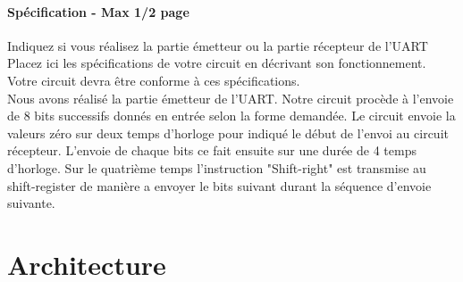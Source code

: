 \documentclass[a4paper]{article} %
\begin{document}


\begin{tcolorbox}[colframe=Monokaimagenta,colback=white]
\paragraph %
{Spécification - Max 1/2 page } 
Indiquez si vous réalisez la partie émetteur ou la partie récepteur de l’UART
Placez ici les spécifications de votre circuit en décrivant son fonctionnement. Votre circuit devra être conforme à ces spécifications.\\

Nous avons réalisé la partie émetteur de l'UART. Notre circuit procède à l'envoie de 8 bits successifs donnés en entrée selon la forme demandée. Le circuit envoie la valeurs zéro sur deux temps d'horloge pour indiqué le début de l'envoi au circuit récepteur. L'envoie de chaque bits ce fait ensuite sur une durée de 4 temps d'horloge. Sur le quatrième temps l'instruction "Shift-right" est transmise au shift-register de manière a envoyer le bits suivant durant la séquence d'envoie suivante.
\end{tcolorbox}

\section{Architecture}\
\end{document}
